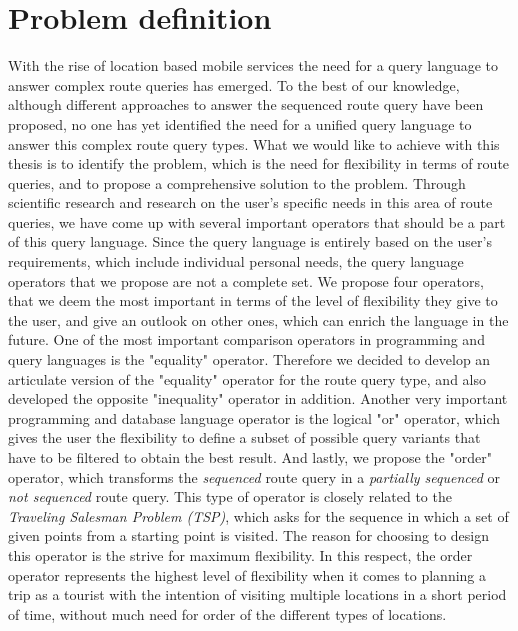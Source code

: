 \section{Problem definition}

With the rise of location based mobile services the need for a query language to answer complex route queries has emerged. To the best of our knowledge, although different approaches to answer the sequenced route query have been proposed, no one has yet identified the need for a unified query language to answer this complex route query types. What we would like to achieve with this thesis is to identify the problem, which is the need for flexibility in terms of route queries, and to propose a comprehensive solution to the problem. Through scientific research and research on the user's specific needs in this area of route queries, we have come up with several important operators that should be a part of this query language. Since the query language is entirely based on the user's requirements, which include individual personal needs, the query language operators that we propose are not a complete set. We propose four operators, that we deem the most important in terms of the level of flexibility they give to the user, and give an outlook on other ones, which can enrich the language in the future. \newline
One of the most important comparison operators in programming and query languages is the "equality" operator. Therefore we decided to develop an articulate version of the "equality" operator for the route query type, and also developed the opposite "inequality" operator in addition. Another very important programming and database language operator is the logical "or" operator, which gives the user the flexibility to define a subset of possible query variants that have to be filtered to obtain the best result. And lastly, we propose the "order" operator, which transforms the \textit{sequenced} route query in a \textit{partially sequenced} or \textit{not sequenced} route query. This type of operator is closely related to the \textit{Traveling Salesman Problem (TSP)}, which asks for the sequence in which a set of given points from a starting point is visited. The reason for choosing to design this operator is the strive for maximum flexibility. In this respect, the order operator represents the highest level of flexibility when it comes to planning a trip as a tourist with the intention of visiting multiple locations in a short period of time, without much need for order of the different types of locations.

